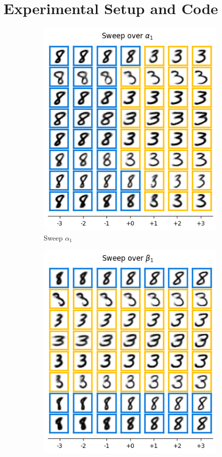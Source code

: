 \section{Experimental Setup and Code}
\label{sec:experiments}
\begin{figure}[t]
\centering
    \begin{subfigure}[t]{.23\linewidth}
        \includegraphics[width=.9\textwidth]{openreview/pictures/Figure3/alpha_1.png}
        \caption{Sweep $\alpha_1$}
    \end{subfigure}
    \begin{subfigure}[t]{.23\linewidth}
        \includegraphics[width=.9\textwidth]{openreview/pictures/Figure3/beta_1.png}

\end{subfigure}
\end{figure}
